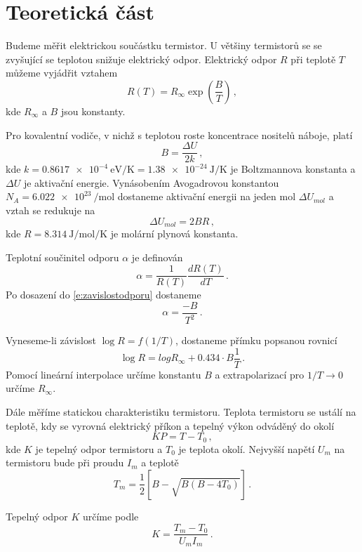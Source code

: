 \section*{Teoretická část}
Budeme měřit elektrickou součástku termistor.
U většiny termistorů se se zvyšující se teplotou snižuje elektrický odpor.
Elektrický odpor $R$ při teplotě $T$ můžeme vyjádřit vztahem \cite{skripta}
\begin{equation} \label{e:zavislostodporu}
R(T)=R_{\infty} \exp \left( \frac{B}{T} \right) \,,
\end{equation}
kde $R_{\infty}$ a $B$ jsou konstanty.

Pro kovalentní vodiče, v nichž s teplotou roste koncentrace nositelů náboje, platí \cite{skripta}
\begin{equation} \label{e:aktivacni}
B=\frac{\Delta U}{2k} \,,
\end{equation}
kde $k=\SI{0.8617e-4}{\electronvolt\per\kelvin}=\SI{1.38e-24}{\joule\per\kelvin}$ je Boltzmannova konstanta a $\Delta U$ je aktivační energie.
Vynásobením Avogadrovou konstantou $N_A = \SI{6.022e23}{\per\mole}$ dostaneme aktivační energii na jeden mol $\Delta U_{mol}$ a vztah se redukuje na
\begin{equation} \label{e:Unamol}
\Delta U_{mol} = 2BR \,,
\end{equation}
kde $R = \SI{8.314}{\joule\per\mole\per\kelvin}$ je molární plynová konstanta.

Teplotní součinitel odporu $\alpha$ je definován \cite{skripta}
\begin{equation}
\alpha = \frac{1}{R(T)} \frac{dR(T)}{dT} \,.
\end{equation}
Po dosazení do \eqref{e:zavislostodporu} dostaneme
\begin{equation} \label{e:soucinitel}
\alpha = \frac{-B}{T^2} \,.
\end{equation}

Vyneseme-li závislost $\log R = f(1/T)$, dostaneme přímku popsanou rovnicí
\begin{equation}
\log R = log R_\infty + \num{0.434} \cdot B \frac{1}{T} \,.
\end{equation}
Pomocí lineární interpolace určíme konstantu $B$ a extrapolarizací pro $1/T \to 0$ určíme $R_\infty$.

Dále měříme statickou charakteristiku termistoru.
Teplota termistoru se ustálí na teplotě, kdy se vyrovná elektrický příkon a tepelný výkon odváděný do okolí \cite{skripta}
\begin{equation}
KP=T-T_0 \,,
\end{equation}
kde $K$ je tepelný odpor termistoru a $T_0$ je teplota okolí.
Nejvyšší napětí $U_m$ na termistoru bude při proudu $I_m$ a teplotě \cite{skripta}
\begin{equation} \label{e:Tm}
T_m = \frac{1}{2} \left[ B - \sqrt{B(B-4T_0)}       \right] \,.
\end{equation}

Tepelný odpor $K$ určíme podle 
\begin{equation} \label{e:tepodpor}
K=\frac{T_m-T_0}{U_m I_m} \,.
\end{equation}